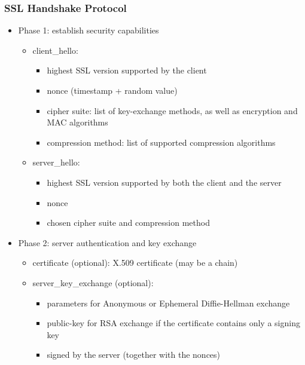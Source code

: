\documentclass[final]{article}
\begin{document}
\subsubsection*{SSL Handshake Protocol}
\begin{itemize}[nosep]
    \item Phase 1: establish security capabilities
          \begin{itemize}[nosep]
              \item client\_hello:
                    \begin{itemize}[nosep]
                        \item highest SSL version supported by the client
                        \item nonce (timestamp + random value)
                        \item cipher suite: list of key-exchange methods, as well as encryption and MAC algorithms
                        \item compression method: list of supported compression algorithms
                    \end{itemize}
              \item server\_hello:
                    \begin{itemize}[nosep]
                        \item highest SSL version supported by both the
                              client and the server
                        \item nonce
                        \item chosen cipher suite and compression method
                    \end{itemize}
          \end{itemize}
    \item Phase 2: server authentication and key exchange
          \begin{itemize}[nosep]
              \item certificate (optional): X.509 certificate (may be a chain)
              \item server\_key\_exchange (optional):
                    \begin{itemize}[nosep]
                        \item parameters for Anonymous or Ephemeral Diffie-Hellman exchange
                        \item public-key for RSA exchange if the certificate contains only a signing key
                        \item signed by the server (together with the nonces)

\end{itemize}
\end{itemize}
\end{itemize}
\end{document}
